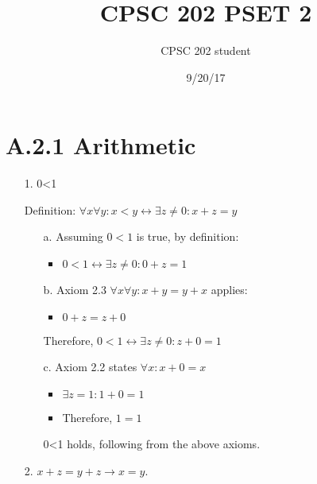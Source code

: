 \documentclass[12pt]{article}
\title{CPSC 202 PSET 2}
\author{CPSC 202 student}
\date{9/20/17}
\begin{document}
\maketitle

\newcommand{\E}{\mathrm{E}}
\newcommand{\Var}{\mathrm{Var}}
\newcommand{\Cov}{\mathrm{Cov}}

\section*{A.2.1 Arithmetic}
\begin{enumerate}
  \item[1.] 0\textless 1
  
    Definition: ${\forall x \forall y : x < y \leftrightarrow \exists z \neq 0 : x + z = y }$
  \begin{enumerate}
    \item[a.]
      Assuming ${0 < 1}$ is true, by definition:
      \begin{itemize}
        \item ${0 < 1 \leftrightarrow \exists z \neq 0 : 0 + z = 1 }$
      \end{itemize}
    \item[b.] Axiom 2.3 ${\forall x \forall y : x + y = y + x}$ applies:
      \begin{itemize}
        \item ${0 + z = z + 0}$
      \end{itemize}

      Therefore, ${0 < 1 \leftrightarrow \exists z \neq 0 : z + 0 = 1 }$
    \item[c.] Axiom 2.2 states ${\forall x: x + 0 = x}$
      \begin{itemize}
        \item ${\exists z = 1 : 1 + 0 = 1}$
        \item Therefore, ${1 = 1}$
      \end{itemize}
      
      0\textless 1 holds, following from the above axioms.
  \end{enumerate}

\item[2.] ${x + z = y + z \rightarrow x = y}$.


\end{enumerate}
\end{document}
